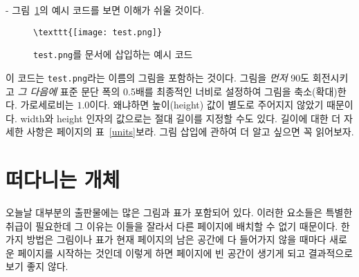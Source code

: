 \begin{adjustwidth}{0pt}{-\margheadwidth}
그림~\ref{figureex}의 예시 코드를 보면 이해가 쉬울 것이다.
\begin{figure}[!htb]
\begin{lined}{10cm}
\begin{verbatim}
\texttt{[image: test.png]}
\end{verbatim}
\end{lined}
\caption{\texttt{test.png}를 문서에 삽입하는 예시 코드\label{figureex}}
\end{figure}
이 코드는 \texttt{test.png}라는 이름의 그림을 포함하는 것이다.
그림을 \emph{먼저} 90도 회전시키고 \emph{그 다음에} 표준 문단 폭의 0.5배를 최종적인 너비로
설정하여 그림을 축소(확대)한다. 가로세로비는 $1.0$이다. 왜냐하면 높이(height) 값이 별도로 주어지지 않았기 때문이다.
width와 height 인자의 값으로는 절대 길이를 지정할 수도 있다. 길이에 대한 더 자세한 사항은 
\pageref{units}페이지의 표~\ref{units}\를 보라. 
그림 삽입에 관하여 더 알고 싶으면 \cite{graphics}\를 꼭 읽어보자.

\section{떠다니는 개체} \label{floats}
오늘날 대부분의 출판물에는 많은 그림과 표가 포함되어 있다. 이러한 요소들은 특별한 취급이 필요한데
그 이유는 이들을 잘라서 다른 페이지에 배치할 수 없기 때문이다.
한 가지 방법은 그림이나 표가 현재 페이지의 남은 공간에 다 들어가지 않을 때마다 새로운 페이지를 시작하는 것인데 
이렇게 하면 페이지에 빈 공간이 생기게 되고 결과적으로 보기 좋지 않다.


\end{adjustwidth}
